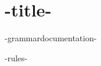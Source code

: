 \documentclass{article}
\begin{document}
\section{-title-}
-grammardocumentation-

-rules-
\end{document}
